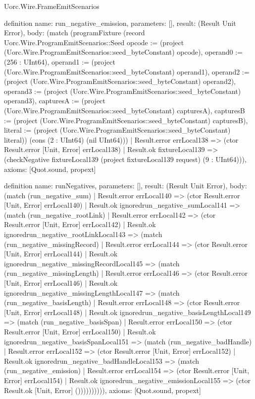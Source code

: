 \begin{lexlean}{Uorc.Wire.FrameEmitScenarios}
\begin{semanticmodule}
definition{
  name: run_negative_emission,
  parameters: [],
  result: (Result Unit Error),
  body: (match (programFixture (record Uorc.Wire.ProgramEmitScenarios::Seed {opcode := (project (Uorc.Wire.ProgramEmitScenarios::seed_byteConstant) opcode), operand0 := (256 : UInt64), operand1 := (project (Uorc.Wire.ProgramEmitScenarios::seed_byteConstant) operand1), operand2 := (project (Uorc.Wire.ProgramEmitScenarios::seed_byteConstant) operand2), operand3 := (project (Uorc.Wire.ProgramEmitScenarios::seed_byteConstant) operand3), capturesA := (project (Uorc.Wire.ProgramEmitScenarios::seed_byteConstant) capturesA), capturesB := (project (Uorc.Wire.ProgramEmitScenarios::seed_byteConstant) capturesB), literal := (project (Uorc.Wire.ProgramEmitScenarios::seed_byteConstant) literal)}) (cons (2 : UInt64) (nil UInt64)))
    | Result.error errLocal138 => (ctor Result.error [Unit, Error] errLocal138)
    | Result.ok fixtureLocal139 => (checkNegative fixtureLocal139 (project fixtureLocal139 request) (9 : UInt64))),
  axioms: [Quot.sound, propext]
}

definition{
  name: runNegatives,
  parameters: [],
  result: (Result Unit Error),
  body: (match (run_negative_sum)
    | Result.error errLocal140 => (ctor Result.error [Unit, Error] errLocal140)
    | Result.ok ignoredrun_negative_sumLocal141 => (match (run_negative_rootLink)
      | Result.error errLocal142 => (ctor Result.error [Unit, Error] errLocal142)
      | Result.ok ignoredrun_negative_rootLinkLocal143 => (match (run_negative_missingRecord)
        | Result.error errLocal144 => (ctor Result.error [Unit, Error] errLocal144)
        | Result.ok ignoredrun_negative_missingRecordLocal145 => (match (run_negative_missingLength)
          | Result.error errLocal146 => (ctor Result.error [Unit, Error] errLocal146)
          | Result.ok ignoredrun_negative_missingLengthLocal147 => (match (run_negative_basisLength)
            | Result.error errLocal148 => (ctor Result.error [Unit, Error] errLocal148)
            | Result.ok ignoredrun_negative_basisLengthLocal149 => (match (run_negative_basisSpan)
              | Result.error errLocal150 => (ctor Result.error [Unit, Error] errLocal150)
              | Result.ok ignoredrun_negative_basisSpanLocal151 => (match (run_negative_badHandle)
                | Result.error errLocal152 => (ctor Result.error [Unit, Error] errLocal152)
                | Result.ok ignoredrun_negative_badHandleLocal153 => (match (run_negative_emission)
                  | Result.error errLocal154 => (ctor Result.error [Unit, Error] errLocal154)
                  | Result.ok ignoredrun_negative_emissionLocal155 => (ctor Result.ok [Unit, Error] ()))))))))),
  axioms: [Quot.sound, propext]
}


\end{semanticmodule}
\end{lexlean}
